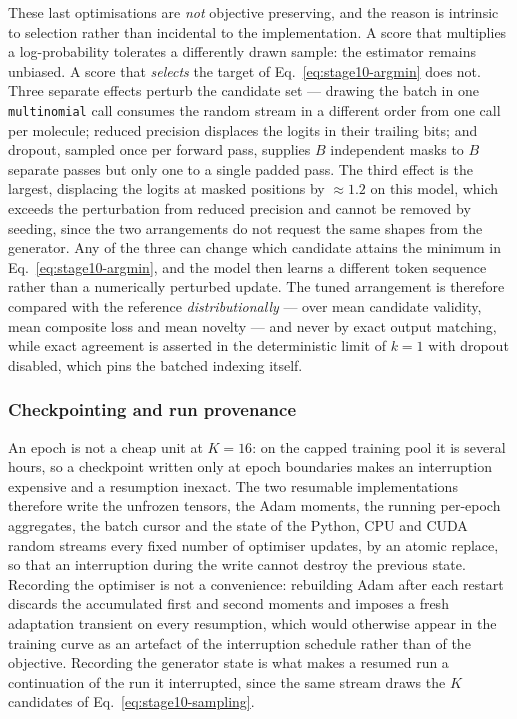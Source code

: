 \documentclass[a4paper,12pt]{article}
\begin{document}
These last optimisations are \emph{not} objective preserving, and the reason is
intrinsic to selection rather than incidental to the implementation. A score
that multiplies a log-probability tolerates a differently drawn sample: the
estimator remains unbiased. A score that \emph{selects} the target of
Eq.~\eqref{eq:stage10-argmin} does not. Three separate effects perturb the
candidate set --- drawing the batch in one \texttt{multinomial} call consumes the
random stream in a different order from one call per molecule; reduced precision
displaces the logits in their trailing bits; and dropout, sampled once per
forward pass, supplies $B$ independent masks to $B$ separate passes but only one
to a single padded pass. The third effect is the largest, displacing the logits
at masked positions by $\approx\!1.2$ on this model, which exceeds the
perturbation from reduced precision and cannot be removed by seeding, since the
two arrangements do not request the same shapes from the generator. Any of the
three can change which candidate attains the minimum in
Eq.~\eqref{eq:stage10-argmin}, and the model then learns a different token
sequence rather than a numerically perturbed update. The tuned arrangement is
therefore compared with the reference \emph{distributionally} --- over mean
candidate validity, mean composite loss and mean novelty --- and never by exact
output matching, while exact agreement is asserted in the deterministic limit of
$k=1$ with dropout disabled, which pins the batched indexing itself.

\subsubsection{Checkpointing and run provenance}

An epoch is not a cheap unit at $K=16$: on the capped training pool it is
several hours, so a checkpoint written only at epoch boundaries makes an
interruption expensive and a resumption inexact. The two resumable
implementations therefore write the unfrozen tensors, the Adam moments, the
running per-epoch aggregates, the batch cursor and the state of the Python, CPU
and CUDA random streams every fixed number of optimiser updates, by an atomic
replace, so that an interruption during the write cannot destroy the previous
state. Recording the optimiser is not a convenience: rebuilding Adam after each
restart discards the accumulated first and second moments and imposes a fresh
adaptation transient on every resumption, which would otherwise appear in the
training curve as an artefact of the interruption schedule rather than of the
objective. Recording the generator state is what makes a resumed run a
continuation of the run it interrupted, since the same stream draws the $K$
candidates of Eq.~\eqref{eq:stage10-sampling}.
\end{document}
